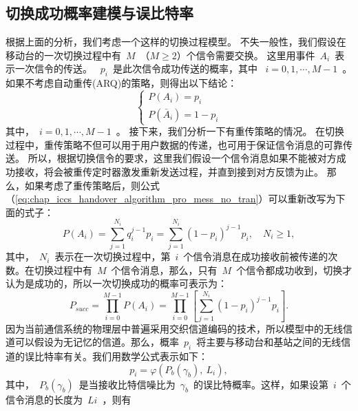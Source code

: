 \subsection{切换成功概率建模与误比特率}
根据上面的分析，我们考虑一个这样的切换过程模型。
不失一般性，我们假设在移动台的一次切换过程中有~$M$~（$M \ge 2 $）个信令需要交换。
这里用事件~$A_i$~表示一次信令的传送。
 ~$p_i$~是此次信令成功传送的概率，其中 ~$i = 0,1, \cdots, M-1 $~。
如果不考虑自动重传(ARQ)的策略，则得出以下结论：
\begin{equation}
\label{eq:chap_iccs_handover_algorithm_pro_mess_no_tran}
\begin{cases}
P(A_{i})=p_{i}\\
P(\bar{A}_{i})=1- p_{i}
\end{cases}
\end{equation}
其中，~$i=0,1,\cdots,M-1$~。
接下来，我们分析一下有重传策略的情况。
在切换过程中，重传策略不但可以用于用户数据的传递，也可用于保证信令消息的可靠传送。
所以，根据切换信令的要求，这里我们假设一个信令消息如果不能被对方成功接收，将会被重传定时器激发重新发送过程，并直到接到对方反馈为止。
那么，如果考虑了重传策略后，则公式 （\ref{eq:chap_iccs_handover_algorithm_pro_mess_no_tran}）可以重新改写为下面的式子：
\begin{equation}
\label{eq:chap_iccs_handover_algorithm_Pro_basic01}
P(A_{i})=\sum_{j=1}^{N_{i}}q_{i}^{j-1}p_{i}=\sum_{j=1}^{N_{i}}
(1-p_{i})^{j-1}p_{i},\quad N_{i}\geq1,
\end{equation}
其中，~$N_i$~表示在一次切换过程中，第~$i$~个信令消息在成功接收前被传递的次数。在切换过程中有~$M$~个信令消息，那么，只有~$M$~个信令都成功收到，切换才认为是成功的，所以一次切换成功的概率可表示为：
\begin{equation}
\label{eq:chap_iccs_handover_algorithm_Pro_basic02}
P_{succ}=\prod_{i=0}^{M-1}P(A_{i})=\prod_{i=0}^{M-1}
\left[\sum_{j=1}^{N_{i}}(1-p_{i})^{j-1}p_{i}\right].
\end{equation}
因为当前通信系统的物理层中普遍采用交织信道编码的技术，所以模型中的无线信道可以假设为无记忆的信道。那么，概率~$p_i$~将主要与移动台和基站之间的无线信道的误比特率有关。我们用数学公式表示如下：
$$
p_{i}=\varphi(P_{b}(\gamma_{b}),\: L_{i}),
$$
其中，~$P_b(\gamma_b)$~是当接收比特信噪比为~$\gamma_b$~的误比特概率。这样，如果设第~$i$~个信令消息的长度为~$Li$~，则有
